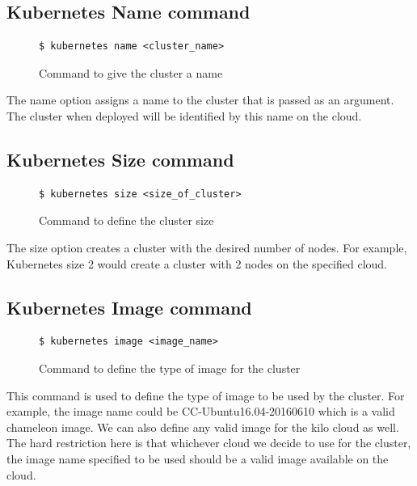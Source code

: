 \documentclass[9pt,twocolumn,twoside]{../../styles/osajnl}
\begin{document}
{\subsection{Kubernetes Name command}
\begin{figure}[H]
\begin{verbatim}
$ kubernetes name <cluster_name>
\end{verbatim}
\caption{Command to give the cluster a name}
\vspace{-4mm}
\label{Command to given the cluster a name}
\end{figure}

The name option assigns a name to the cluster that is passed as an
argument. The cluster when deployed will be identified by this name on the
cloud.
\subsection{Kubernetes Size command}

\begin{figure}[H]
\begin{verbatim}
$ kubernetes size <size_of_cluster>
\end{verbatim}
\caption{Command to define the cluster size}
\vspace{-4mm}
\label{Command to define the cluster size}
\end{figure}

The size option creates a cluster with the desired number of
nodes. For example, Kubernetes size 2 would create a cluster with 2
nodes on the specified cloud.

\subsection{Kubernetes Image command}
\begin{figure}[H]
\begin{verbatim}
$ kubernetes image <image_name>
\end{verbatim}
\caption{Command to define the type of image for the cluster}
\vspace{-4mm}
\label{Command to define the type of image for the cluster}
\end{figure}

This command is used to define the type of image to be used by the
cluster. For example, the image name could be CC-Ubuntu16.04-20160610
which is a valid chameleon image. We can also define any valid image
for the kilo cloud as well. The hard restriction here is that
whichever cloud we decide to use for the cluster, the image name
specified to be used should be a valid image available on the cloud.

}
\end{document}
